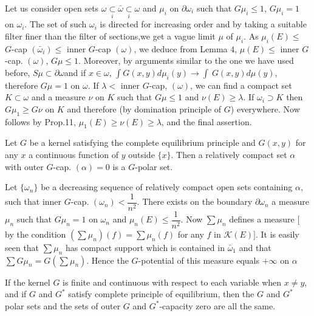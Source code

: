 Let us consider open sets $ \omega \underset{i}{\subset} \bar{\omega}
\underset{i}{\subset} \omega $ and $\mu_i$ on $ \partial \omega_i$
such that $G \mu_i \leq 1$, $ G \mu_i = 1$ on $\omega_i$. The set  of
such $\omega_i$ is directed for increasing order and by taking a
suitable filter finer than the filter of sections,we get a vague limit
$\mu$ of $\mu_i$. As $ \mu_i (E) \leq $ $G$-cap $ (\bar{\omega}_i)
\leq $ inner $G$-cap $(\omega)$, we deduce from Lemma $4$, $\mu(E)\leq
$ inner $G$-cap. $(\omega)$, $G \mu \leq 1 $. Moreover, by arguments
similar to the one we have used before, $ S \mu \subset \partial
\omega$\pageoriginale and if   $ x \in \omega $, $ \int G (x,y) d \mu_i (y) \to
\int ~ G (x,y) d \mu (y) $, therefore $G \mu = 1 $ on $\omega$. If  $
\lambda < $ inner $G$-cap, $ (\omega) $, we can find a compact set $ K
\subset \omega $ and a measure $\nu$ on $K$ such that $G \mu \leq 1$
and  $\nu (E) \geq \lambda $. If $ \omega_i \supset K $ then  $ G \mu_1
\geq G \nu $ on $K$ and therefore (by domination principle of $G$)
everywhere. Now follows by Prop.11, $\mu_1 (E) \geq \nu (E) \geq
\lambda$, and  the final assertion.  

\begin{thm}\label{p3:chap4:sec12:thm10}%
  Let $G$ be a kernel satisfying the complete equilibrium principle
  and $G (x,y)$ for any $x$ a continuous function of $y$ outside $
  \big \{ x \big \} $. Then a relatively  compact set $\alpha$ with
  outer $G$-cap. $(\alpha) = 0 $ is a $G$-polar set.  
\end{thm}

Let $ \big \{ \omega_n \big \} $ be a decreasing sequence of
relatively compact open sets containing $\alpha$, such that inner
$G$-cap. $ ( \omega_n ) < \dfrac{1}{n^2} $. There exists on the
boundary $ \partial \omega_n $ a measure $\mu_n$ such that $ G \mu_n =
1 $ on $ \omega_n $ and $ \mu_n (E) \leq \dfrac{1}{n^2} $. Now $ \sum
\mu_n $ defines a measure $[$ by the condition $ ( \sum \mu_n ) (f) =
  \sum \mu_n (f) $ for any $f$ in $  \mathscr{K} (E) ] $. It is easily
seen that  $ \sum \mu_n $ has compact support which is contained in $
\bar{\omega}_1 $ and that $ \sum G \mu_n = G ( \sum \mu_n ) $. Hence
the $G$-potential of this measure equals $ + \infty $ on $ \alpha$ 

\begin{coro*}
  If the kernel $G$ is finite and continuous with respect to each
  variable when $ x \neq y $, and if $G$ and $G^*$ satisfy complete
  principle of equilibrium, then the $G$ and $G^*$  polar sets and the
  sets of outer $G$ and $G^*$-capacity zero are all the same. 
\end{coro*}

